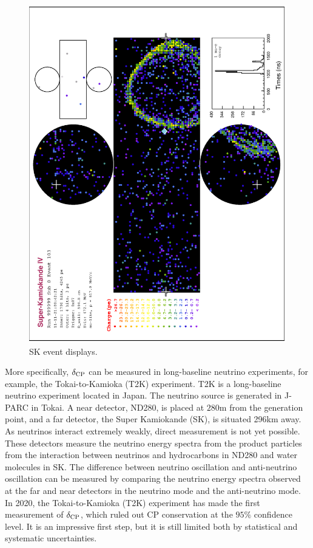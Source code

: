 \begin{figure}
               \includegraphics[width=\dbfigwid\textwidth]{figures/t2k/sk-numu.eps}
          \caption{SK event displays.}
          \label{fig:sk-e-mu}
    \end{figure}


More specifically, $\delta_\textrm{CP}$ can be measured in long-baseline neutrino experiments, for example, the Tokai-to-Kamioka (T2K) experiment\cite{T2KEXP}. 
T2K is a long-baseline neutrino experiment located in Japan. 
The neutrino source is generated in J-PARC in Tokai. 
A near detector, ND280, is placed at $280\mathrm{m}$ from the generation point, and a far detector, the Super Kamiokande (SK), is situated 296km away. As neutrinos interact extremely weakly, direct measurement is not yet possible. These detectors measure the neutrino energy spectra from the product particles from the interaction between neutrinos and hydrocarbons in ND280 and water molecules in SK. The difference between neutrino oscillation and anti-neutrino oscillation can be measured by comparing the neutrino energy spectra observed at the far and near detectors in the neutrino mode and the anti-neutrino mode. In 2020, the Tokai-to-Kamioka (T2K) experiment\cite{T2KEXP} has made the first measurement of $\delta_\textrm{CP}$\cite{T2Knature}, which ruled out CP conservation at the $95\%$ confidence level. It is an impressive first step, but it is still limited both by statistical and systematic uncertainties. 

